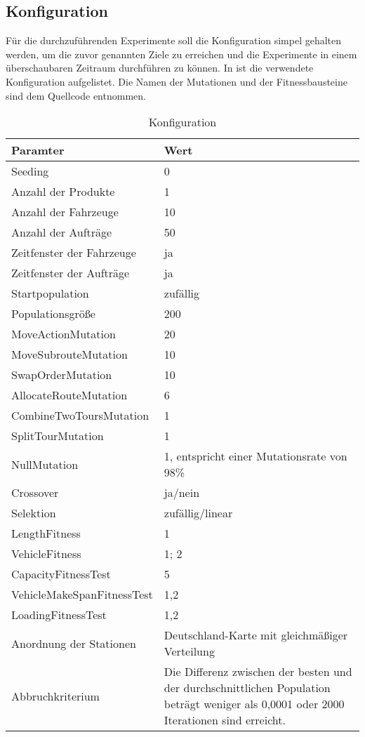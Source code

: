 \subsection{Konfiguration}
\label{sec:Konfiguration}
Für die durchzuführenden Experimente soll die Konfiguration simpel gehalten werden, um die zuvor genannten Ziele zu erreichen und die Experimente in einem überschaubaren Zeitraum durchführen zu können. In  ist die verwendete Konfiguration aufgelistet. Die Namen der Mutationen und der Fitnessbausteine sind dem Quellcode entnommen.

\begin{table}[ht!]
 \caption{Konfiguration}
 \begin{tabular}{lp{9cm}}
 \toprule
 \textbf {Paramter} & \textbf{Wert} \\
 \toprule
 Seeding & 0 \\
 \midrule
 Anzahl der Produkte & 1 \\
 \midrule
 Anzahl der Fahrzeuge & 10 \\
 \midrule
 Anzahl der Aufträge & 50 \\
 \midrule
 Zeitfenster der Fahrzeuge & ja \\
 \midrule
 Zeitfenster der Aufträge & ja \\
 \midrule
 Startpopulation & zufällig \\
 \midrule
 Populationsgröße & 200 \\
 \midrule
 MoveActionMutation & 20 \\
 \midrule
 MoveSubrouteMutation & 10 \\
 \midrule
 SwapOrderMutation & 10 \\
 \midrule
 AllocateRouteMutation & 6 \\
 \midrule
 CombineTwoToursMutation & 1 \\
 \midrule
 SplitTourMutation & 1 \\
 \midrule
 NullMutation & 1, entspricht einer Mutationsrate von 98\% \\
 \midrule
 Crossover & ja/nein \\
 \midrule
 Selektion & zufällig/linear \\
 \midrule
 LengthFitness & 1 \\
 \midrule
 VehicleFitness & 1; 2 \\
 \midrule
 CapacityFitnessTest & 5 \\
 \midrule
 VehicleMakeSpanFitnessTest & 1,2 \\
 \midrule
 LoadingFitnessTest & 1,2 \\
 \midrule
 Anordnung der Stationen & Deutschland-Karte mit gleichmäßiger Verteilung \\
 \midrule
 Abbruchkriterium & Die Differenz zwischen der besten und der durchschnittlichen Population beträgt weniger als 0,0001 oder 2000 Iterationen sind erreicht. \\
 \bottomrule
 \end{tabular}
 \label{tab:Konfiguration}
\end{table}

